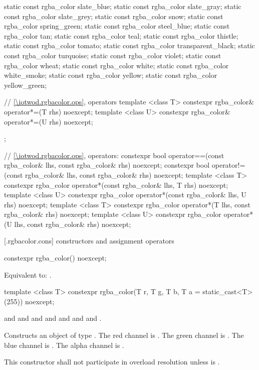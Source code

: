 \begin{codeblock}
{{    static const rgba_color slate_blue;
    static const rgba_color slate_gray;
    static const rgba_color slate_grey;
    static const rgba_color snow;
    static const rgba_color spring_green;
    static const rgba_color steel_blue;
    static const rgba_color tan;
    static const rgba_color teal;
    static const rgba_color thistle;
    static const rgba_color tomato;
    static const rgba_color transparent_black;
    static const rgba_color turquoise;
    static const rgba_color violet;
    static const rgba_color wheat;
    static const rgba_color white;
    static const rgba_color white_smoke;
    static const rgba_color yellow;
    static const rgba_color yellow_green;
    
    // \ref{\iotwod.rgbacolor.ops}, operators
    template <class T>
    constexpr rgba_color& operator*=(T rhs) noexcept;
    template <class U>
    constexpr rgba_color& operator*=(U rhs) noexcept;
  };

  // \ref{\iotwod.rgbacolor.ops}, operators:
  constexpr bool operator==(const rgba_color& lhs, const rgba_color& rhs) 
    noexcept;
  constexpr bool operator!=(const rgba_color& lhs, const rgba_color& rhs) 
    noexcept;
  template <class T>
  constexpr rgba_color operator*(const rgba_color& lhs, T rhs) noexcept;
  template <class U>
  constexpr rgba_color operator*(const rgba_color& lhs, U rhs) noexcept;
  template <class T>
  constexpr rgba_color operator*(T lhs, const rgba_color& rhs) noexcept;
  template <class U>
  constexpr rgba_color operator*(U lhs, const rgba_color& rhs) noexcept;
}
\end{codeblock}

 [\iotwod.rgbacolor.cons] { constructors and assignment operators}

%
\begin{itemdecl}
constexpr rgba_color() noexcept;
\end{itemdecl}
\begin{itemdescr}
\pnum
\effects
Equivalent to: .
\end{itemdescr}

%
\begin{itemdecl}
template <class T>
constexpr rgba_color(T r, T g, T b, T a = static_cast<T>(255)) noexcept;
\end{itemdecl}
\begin{itemdescr}
\pnum
\requires
{} and  and  and  and  and  and  and .

\pnum
\effects
Constructs an object of type . The red channel is . The green channel is . The blue channel is . The alpha channel is .

\pnum
\remarks
This constructor shall not participate in overload resolution unless  is .
\end{itemdescr}

